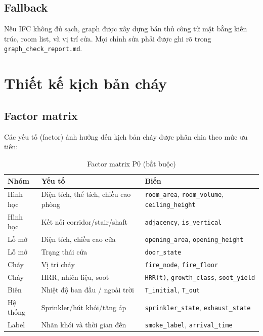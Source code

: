 \subsection{Fallback}

Nếu IFC không đủ sạch, graph được xây dựng bán thủ công từ mặt bằng kiến trúc, room list, và vị trí cửa. Mọi chỉnh sửa phải được ghi rõ trong \texttt{graph\_check\_report.md}.

\section{Thiết kế kịch bản cháy}
\label{sec:kichban}

\subsection{Factor matrix}

Các yếu tố (factor) ảnh hưởng đến kịch bản cháy được phân chia theo mức ưu tiên:

\begin{table}[H]
\centering
\caption{Factor matrix P0 (bắt buộc)}
\label{tab:factorP0}
\begin{tabularx}{\textwidth}{l l X}
\toprule
\textbf{Nhóm} & \textbf{Yếu tố} & \textbf{Biến} \\
\midrule
Hình học  & Diện tích, thể tích, chiều cao phòng & \texttt{room\_area}, \texttt{room\_volume}, \texttt{ceiling\_height} \\
Hình học  & Kết nối corridor/stair/shaft          & \texttt{adjacency}, \texttt{is\_vertical} \\
Lỗ mở    & Diện tích, chiều cao cửa              & \texttt{opening\_area}, \texttt{opening\_height} \\
Lỗ mở    & Trạng thái cửa                        & \texttt{door\_state} \\
Cháy      & Vị trí cháy                           & \texttt{fire\_node}, \texttt{fire\_floor} \\
Cháy      & HRR, nhiên liệu, soot                 & \texttt{HRR(t)}, \texttt{growth\_class}, \texttt{soot\_yield} \\
Biên      & Nhiệt độ ban đầu / ngoài trời         & \texttt{T\_initial}, \texttt{T\_out} \\
Hệ thống & Sprinkler/hút khói/tăng áp             & \texttt{sprinkler\_state}, \texttt{exhaust\_state} \\
Label     & Nhãn khói và thời gian đến             & \texttt{smoke\_label}, \texttt{arrival\_time} \\
\bottomrule
\end{tabularx}
\end{table}

